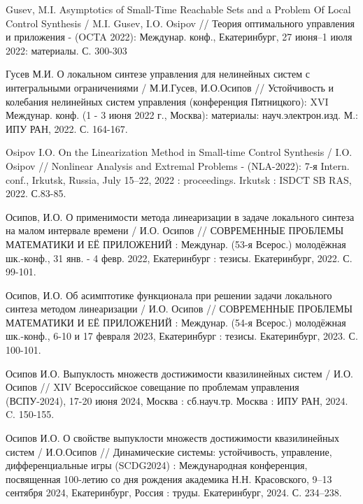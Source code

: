 \documentclass[../main.tex]{subfiles}
\begin{document}
\begin{thebibliography}{99}
Gusev, M.I. 
Asymptotics of Small-Time Reachable Sets and a Problem Of Local Control Synthesis / 
M.I. Gusev, I.O. Osipov // 
Теория оптимального управления и приложения - (OCTA 2022): 
Междунар. конф., Екатеринбург, 27 июня–1 июля 2022: 
материалы. С. 300-303

Гусев М.И. О локальном синтезе управления для нелинейных систем с интегральными ограничениями / М.И.Гусев, И.О.Осипов // Устойчивость и колебания нелинейных систем управления (конференция Пятницкого): XVI Междунар. конф. (1 - 3 июня 2022 г., Москва): материалы: науч.электрон.изд. М.: ИПУ РАН, 2022. С. 164-167.

Osipov I.O. On the Linearization Method in Small-time Control Synthesis / I.O. Osipov // Nonlinear Analysis and Extremal Problems - (NLA-2022): 7-я Intern. conf., Irkutsk, Russia, July 15–22, 2022 : proceedings. Irkutsk : ISDCT SB RAS, 2022. С.83-85.

Осипов, И.О. О применимости метода линеаризации в задаче локального синтеза на малом интервале времени / И.О. Осипов // СОВРЕМЕННЫЕ ПРОБЛЕМЫ МАТЕМАТИКИ И ЕЁ ПРИЛОЖЕНИЙ : Междунар. (53-я Всерос.) молодёжная шк.-конф., 31 янв. - 4 февр. 2022, Екатеринбург : тезисы. Екатеринбург, 2022. С. 99-101.

Осипов, И.О. Об асимптотике функционала при решении задачи локального синтеза методом линеаризации / И.О. Осипов // СОВРЕМЕННЫЕ ПРОБЛЕМЫ МАТЕМАТИКИ И ЕЁ ПРИЛОЖЕНИЙ : Междунар. (54-я Всерос.) молодёжная шк.-конф., 6-10 и 17 февраля 2023, Екатеринбург : тезисы. Екатеринбург, 2023. С. 100-101. 

Осипов И.О. Выпуклость множеств достижимости квазилинейных систем / И.О. Осипов // XIV Всероссийское совещание по проблемам управления (ВСПУ-2024), 17-20 июня 2024, Москва : сб.науч.тр. Москва : ИПУ РАН, 2024. C. 150-155.  

Осипов И.О. О свойстве выпуклости множеств достижимости квазилинейных систем / И.О.Осипов // Динамические системы: устойчивость, управление, дифференциальные игры (SCDG2024) : Международная конференция, посвященная 100-летию со дня рождения академика Н.Н. Красовского, 9–13 сентября 2024, Екатеринбург, Россия : труды. Екатеринбург, 2024. С. 234–238.  




\end{thebibliography}
\end{document}
